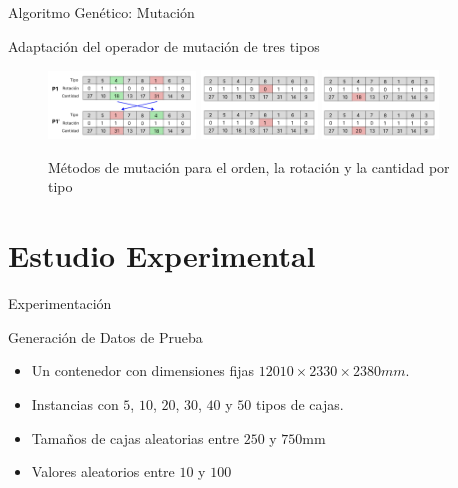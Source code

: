 \documentclass{beamer}
\begin{document}
\begin{frame}{Algoritmo Genético: Mutación}
    \begin{exampleblock}{Adaptación del operador de mutación de tres tipos}
        \vspace{1cm}
        \begin{figure}[H]
            \centering
            \includegraphics[width=0.35\textwidth]{pic/ag-mutacion1.png}
            \includegraphics[width=0.275\textwidth]{pic/ag-mutacion2.png}
            \includegraphics[width=0.275\textwidth]{pic/ag-mutacion3.png}
            \caption*{Métodos de mutación para el orden, la rotación y la cantidad por tipo}
            \label{fig:mutacion}
        \end{figure}
    \end{exampleblock}
\end{frame}

\section[Experimentación]{Estudio Experimental}

\begin{frame}{Experimentación}
    \begin{exampleblock}{Generación de Datos de Prueba}
        \begin{itemize}[<+-| alert@+>]
            \item Un contenedor con dimensiones fijas $12010 \times 2330 \times 2380 mm$.
            \item Instancias con $5$, $10$, $20$, $30$, $40$ y $50$ tipos de cajas.
            \item Tamaños de cajas aleatorias entre $250$ y $750$mm
            \item Valores aleatorios entre $10$ y $100$
        \end{itemize}
    \end{exampleblock}
\end{frame}
\end{document}
